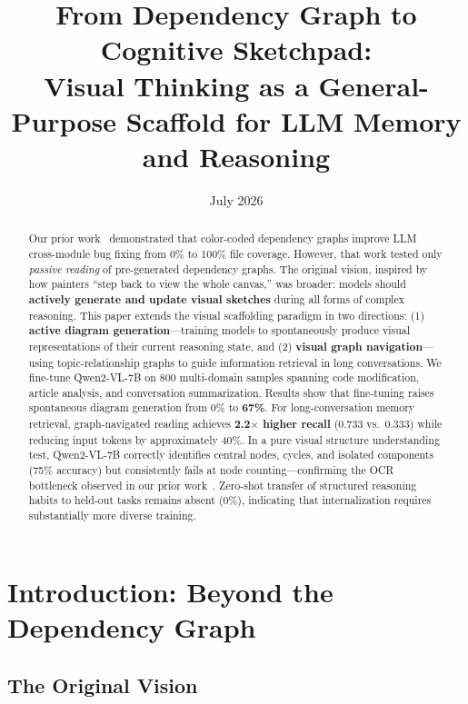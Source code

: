 \documentclass[11pt,a4paper]{article}
\title{\bfseries From Dependency Graph to Cognitive Sketchpad:\\[3pt]
       \large Visual Thinking as a General-Purpose Scaffold for LLM Memory and Reasoning}
\author{}
\date{July 2026}
\begin{document}
\maketitle

\begin{abstract}
Our prior work~\cite{depgraph2026} demonstrated that color-coded dependency graphs improve LLM cross-module bug fixing from 0\% to 100\% file coverage. However, that work tested only \textit{passive reading} of pre-generated dependency graphs. The original vision, inspired by how painters ``step back to view the whole canvas,'' was broader: models should \textbf{actively generate and update visual sketches} during all forms of complex reasoning. This paper extends the visual scaffolding paradigm in two directions: (1) \textbf{active diagram generation}---training models to spontaneously produce visual representations of their current reasoning state, and (2) \textbf{visual graph navigation}---using topic-relationship graphs to guide information retrieval in long conversations. We fine-tune Qwen2-VL-7B on 800 multi-domain samples spanning code modification, article analysis, and conversation summarization. Results show that fine-tuning raises spontaneous diagram generation from 0\% to \textbf{67\%}. For long-conversation memory retrieval, graph-navigated reading achieves \textbf{2.2$\times$ higher recall} (0.733 vs.\ 0.333) while reducing input tokens by approximately 40\%. In a pure visual structure understanding test, Qwen2-VL-7B correctly identifies central nodes, cycles, and isolated components (75\% accuracy) but consistently fails at node counting---confirming the OCR bottleneck observed in our prior work~\cite{depgraph2026}. Zero-shot transfer of structured reasoning habits to held-out tasks remains absent (0\%), indicating that internalization requires substantially more diverse training.
\end{abstract}


\section{Introduction: Beyond the Dependency Graph}

\subsection{The Original Vision}
\end{document}
